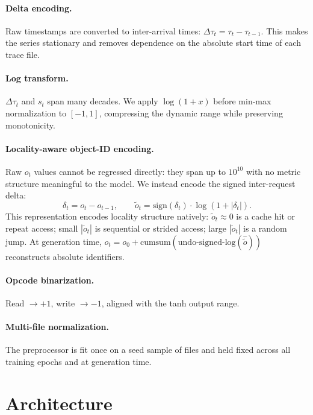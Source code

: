 \documentclass[10pt,twocolumn]{article}
\begin{document}
\paragraph{Delta encoding.}
Raw timestamps are converted to inter-arrival times:
$\Delta\tau_t = \tau_t - \tau_{t-1}$.  This makes the series
stationary and removes dependence on the absolute start time of
each trace file.

\paragraph{Log transform.}
$\Delta\tau_t$ and $s_t$ span many decades.  We apply
$\log(1 + x)$ before min-max normalization to $[-1,1]$,
compressing the dynamic range while preserving monotonicity.

\paragraph{Locality-aware object-ID encoding.}
Raw $o_t$ values cannot be regressed directly: they span up to
$10^{10}$ with no metric structure meaningful to the model.
We instead encode the signed inter-request delta:
\[
  \delta_t = o_t - o_{t-1}, \qquad
  \tilde{o}_t = \text{sign}(\delta_t) \cdot \log(1 + |\delta_t|).
\]
This representation encodes locality structure natively:
$\tilde{o}_t \approx 0$ is a cache hit or repeat access;
small $|\tilde{o}_t|$ is sequential or strided access;
large $|\tilde{o}_t|$ is a random jump.  At generation time,
$o_t = o_0 + \text{cumsum}(\text{undo-signed-log}(\hat{\tilde{o}}))$
reconstructs absolute identifiers.

\paragraph{Opcode binarization.}
Read $\to +1$, write $\to -1$, aligned with the tanh output range.

\paragraph{Multi-file normalization.}
The preprocessor is fit once on a seed sample of files and held
fixed across all training epochs and at generation time.


\section{Architecture}
\label{sec:architecture}
\end{document}
